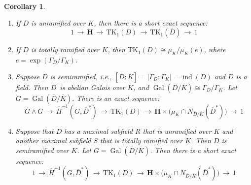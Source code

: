\documentclass[11pt]{article}
\numberwithin{equation}{section}
\theoremstyle{plain}
\newtheorem{corollary}[theorem]{Corollary}
\theoremstyle{remark}
\newcommand{\opn}{\operatorname}
\newcommand{\TK}{\opn{TK_1}}
\newcommand{\ov}{\overline}
\newcommand{\bH}{\mathbf{H}}
\begin{document}
\begin{corollary}{\phantom{.}}
\label{cor:TK_1(D)cases}
\begin{enumerate}[font=\normalfont]
\item[(i)] 
If $D$ is unramified over $K$, then 
there is a short exact sequence:
$$
1 \,\longrightarrow\, \bH\,\longrightarrow \, \TK(D)\, \longrightarrow \,  \TK(\overline D)\, \longrightarrow \,1
$$  
\item[(ii)] 
If $D$ is totally ramified over $K$, then $\TK(D)\cong\mu_K/\mu_K(e)$, where $e=\exp(\Gamma_D/\Gamma_K)$.
\item[(iii)] 
Suppose $D$ is semiramified, i.e., $[\ov D:\ov K] = |\Gamma_D:\Gamma_K| = \opn{ind}(D)$ and $\ov D$ is a field.
Then $\ov D$~is abelian Galois over $\ov K$, and $\opn{Gal}(\ov D/\ov K) \cong \Gamma_D/\Gamma_K$.  Let 
$G = \opn{Gal}(\ov D/\ov K)$.  There is an exact sequence:
$$
G \wedge G \, \longrightarrow \, \widehat H^{-1}(G, \ov D^*) \, \longrightarrow \, \TK(D)\, \longrightarrow \, 
\bH \times \big(\mu_{\ov K} \cap N_{\ov D/\ov K}(\ov D^*)\big)\, \longrightarrow \, 1 
$$ 
\item[(iv)] 
Suppose that $D$ has a maximal subfield $R$ that is unramified over $K$ and another maximal subfield $S$
that is totally ramified over $K$.  Then $D$ is semiramified over $K$.  Let $G = \opn{Gal}(\ov D / \ov K)$.  Then 
there is a short exact sequence:
$$
1\,\longrightarrow \,  \widehat H^{-1}(G, \ov D^*) \, \longrightarrow \, \TK(D)\, \longrightarrow \, 
\bH \times \big(\mu_{\ov K} \cap N_{\ov D/\ov K}(\ov D^*)\big)\, \longrightarrow \, 1 
$$
\end{enumerate}
\end{corollary}
\end{document}
